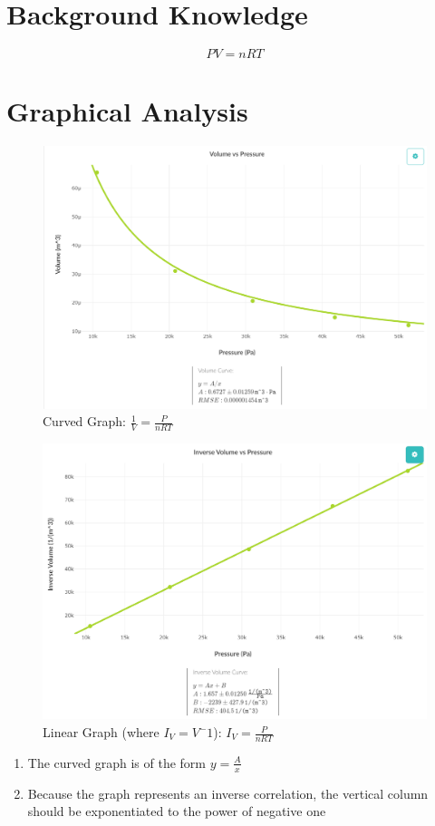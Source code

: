 \documentclass{article}
\begin{document}
\section{Background Knowledge}

\begin{equation}
  PV=nRT
  \label{1}
\end{equation}

\section{Graphical Analysis}

\begin{figure}[H]
  \centering
  \includegraphics[width=.75\textwidth]{Figures/Curved.png}
  \caption{Curved Graph: $\frac{1}{V}=\frac{P}{nRT}$}
  \label{fig:2}
\end{figure}

\begin{figure}[H]
  \centering
  \includegraphics[width=.75\textwidth]{Figures/Linear.png}
  \caption{Linear Graph (where $I_V=V^-1$): $I_V=\frac{P}{nRT}$}
  \label{fig:3}
\end{figure}

\begin{enumerate}

  \item The curved graph is of the form $y=\frac{A}{x}$

  \item Because the graph represents an inverse correlation, the vertical column should be exponentiated to the power of negative one

\end{enumerate}
\end{document}
